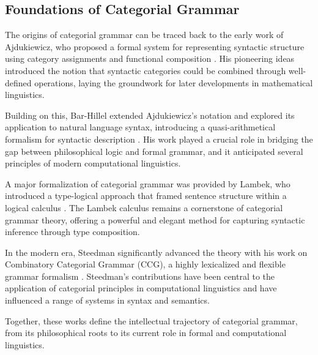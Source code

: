 \subsection{Foundations of Categorial Grammar}

The origins of categorial grammar can be traced back to the early work of Ajdukiewicz, who proposed a formal system for representing syntactic structure using category assignments and functional composition \cite{ajdukiewicz1935syntaktische}. His pioneering ideas introduced the notion that syntactic categories could be combined through well-defined operations, laying the groundwork for later developments in mathematical linguistics.

Building on this, Bar-Hillel extended Ajdukiewicz's notation and explored its application to natural language syntax, introducing a quasi-arithmetical formalism for syntactic description \cite{barhillel1953quasi}. His work played a crucial role in bridging the gap between philosophical logic and formal grammar, and it anticipated several principles of modern computational linguistics.

A major formalization of categorial grammar was provided by Lambek, who introduced a type-logical approach that framed sentence structure within a logical calculus \cite{lambek1958mathematics}. The Lambek calculus remains a cornerstone of categorial grammar theory, offering a powerful and elegant method for capturing syntactic inference through type composition.

In the modern era, Steedman significantly advanced the theory with his work on Combinatory Categorial Grammar (CCG), a highly lexicalized and flexible grammar formalism \cite{steedman1996surface}. Steedman's contributions have been central to the application of categorial principles in computational linguistics and have influenced a range of systems in syntax and semantics.

Together, these works define the intellectual trajectory of categorial grammar, from its philosophical roots to its current role in formal and computational linguistics.
